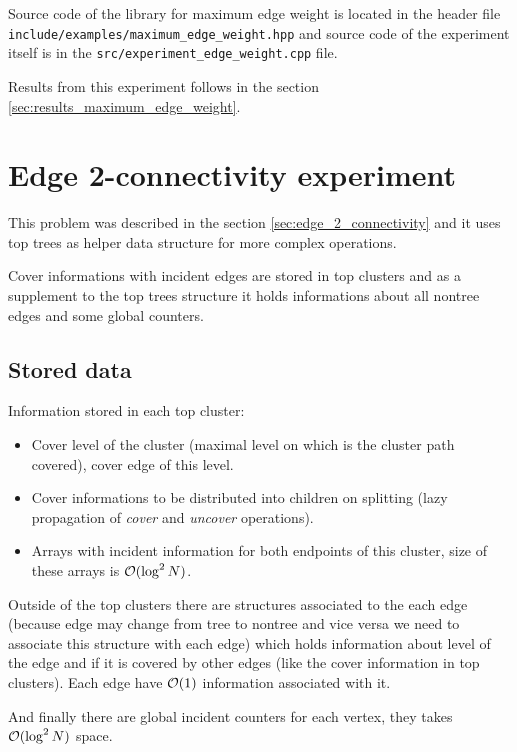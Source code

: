Source code of the library for maximum edge weight is located in the header file
\texttt{include/examples/maximum\_edge\_weight.hpp} and source code of the
experiment itself is in the \texttt{src/experiment\_edge\_weight.cpp} file.

Results from this experiment follows in the section
\ref{sec:results_maximum_edge_weight}.

\vfill\eject %

\section{Edge 2-connectivity experiment}
\label{sec:experiment_edge_2_connectivity}

This problem was described in the section \ref{sec:edge_2_connectivity} and it
uses top trees as helper data structure for more complex operations.

Cover informations with incident edges are stored in top clusters and as a
supplement to the top trees structure it holds informations about all nontree
edges and some global counters.

\subsection{Stored data}

Information stored in each top cluster:
\begin{itemize}
\item Cover level of the cluster (maximal level on which is the cluster path
covered), cover edge of this level.

\item Cover informations to be distributed into children on splitting (lazy
propagation of {\it cover} and {\it uncover} operations).

\item Arrays with incident information for both endpoints of this cluster, size
of these arrays is ${\cal O}(\log^2 N)$.
\end{itemize}

Outside of the top clusters there are structures associated to the each edge
(because edge may change from tree to nontree and vice versa we need to associate
this structure with each edge) which holds information about level of the edge
and if it is covered by other edges (like the cover information in top
clusters). Each edge have ${\cal O}(1)$ information associated with it.

And finally there are global incident counters for each vertex, they takes
${\cal O}(\log^2 N)$ space.

